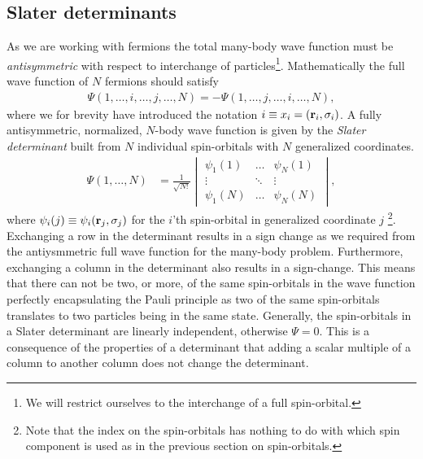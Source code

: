         \subsection{Slater determinants}
            As we are working with fermions the total many-body wave function must
            be \emph{antisymmetric} with respect to interchange of
            particles\footnote{We will restrict ourselves to the interchange of a
            full spin-orbital.}. Mathematically the full wave function of $N$
            fermions should satisfy
            \begin{align}
                \Psi(1, \dots, i, \dots, j, \dots, N)
                =
                -\Psi(1, \dots, j, \dots, i, \dots, N),
            \end{align}
            where we for brevity have introduced the notation $i \equiv x_i =
            (\mathbf{r}_i, \sigma_i)$. A fully antisymmetric, normalized, $N$-body wave
            function is given by the \emph{Slater determinant} built from $N$
            individual spin-orbitals with $N$ generalized coordinates.
            \begin{align}
                \Psi(1, \dots, N)
                &= \frac{1}{\sqrt{N!}}
                \begin{vmatrix}
                    \psi_1(1) & \dots & \psi_N(1) \\
                    \vdots & \ddots & \vdots \\
                    \psi_1(N) & \dots & \psi_N(N)
                \end{vmatrix},
                \label{eq:coord_slater}
            \end{align}
            where $\psi_i(j) \equiv \psi_i(\mathbf{r}_j, \sigma_j)$ for the $i$'th
            spin-orbital in generalized coordinate $j$ \footnote{Note that the index
            on the spin-orbitals has nothing to do with which spin component is used
            as in the previous section on spin-orbitals.}. Exchanging a row in the
            determinant results in a sign change as we required from the
            antiysmmetric full wave function for the many-body problem. Furthermore,
            exchanging a column in the determinant also results in a sign-change.
            This means that there can not be two, or more, of the same spin-orbitals
            in the wave function perfectly encapsulating the Pauli principle as two
            of the same spin-orbitals translates to two particles being in the same
            state. Generally, the spin-orbitals in a Slater determinant are linearly
            independent, otherwise $\Psi = 0$. This is a consequence of the
            properties of a determinant that adding a scalar multiple of a column to
            another column does not change the determinant.

